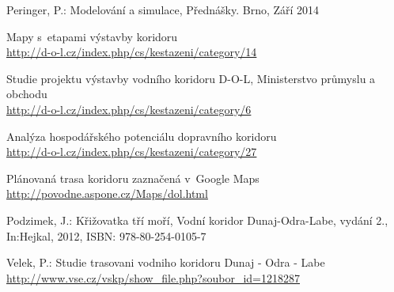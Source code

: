 \documentclass[11pt,a4paper]{article}
\begin{document}
    \begin{enumerate}[label={[\arabic*]}]
      \item Peringer, P.: Modelování a simulace, Přednášky. Brno, Září 2014
        \label{peringer}
      \item Mapy s~etapami výstavby koridoru \\
        \href{http://d-o-l.cz/index.php/cs/kestazeni/category/14}
        {http://d-o-l.cz/index.php/cs/kestazeni/category/14} \label{mapa}
      \item Studie projektu výstavby vodního koridoru D-O-L,
            Ministerstvo průmyslu a obchodu \\
        \href{http://d-o-l.cz/index.php/cs/kestazeni/category/6}
             {http://d-o-l.cz/index.php/cs/kestazeni/category/6} \label{studie}
      \item Analýza hospodářského potenciálu dopravního koridoru \\
        \href{http://d-o-l.cz/index.php/cs/kestazeni/category/27}
             {http://d-o-l.cz/index.php/cs/kestazeni/category/27} \label{analyza}
      \item Plánovaná trasa koridoru zaznačená v~Google Maps \\
        \href{http://povode.aspone.cz/Maps/dol.html}
             {http://povodne.aspone.cz/Maps/dol.html} \label{google-mapa}
      \item Podzimek, J.: Křižovatka tří moří, Vodní koridor Dunaj-Odra-Labe,
            vydání 2., In:Hejkal, 2012, ISBN: 978-80-254-0105-7 \label{kniha}
      \item Velek, P.: Studie trasovani vodniho koridoru Dunaj - Odra - Labe \\
        \href{http://www.vse.cz/vskp/show\_file.php?soubor\_id=1218287}
             {http://www.vse.cz/vskp/show\_file.php?soubor\_id=1218287} \label{bp-studie-trasovani}
    \end{enumerate}

  
\end{document}
